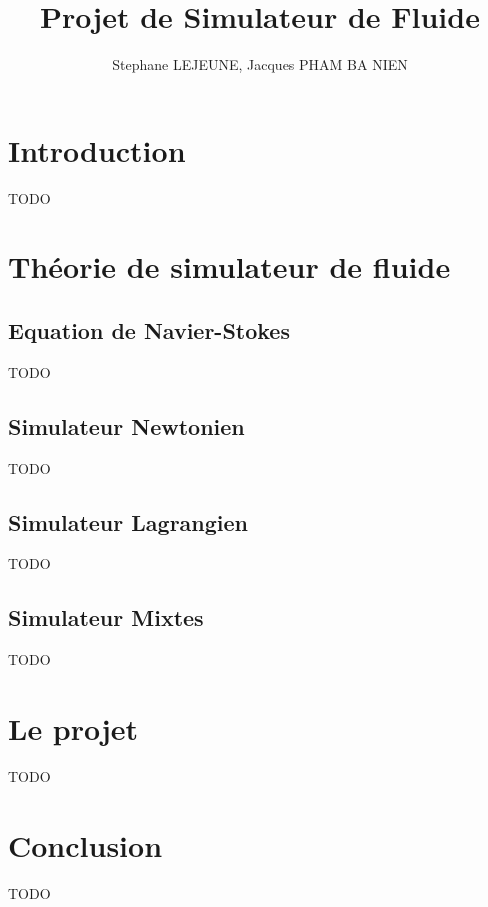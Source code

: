 \documentclass{article}
\author{Stephane LEJEUNE, Jacques PHAM BA NIEN} %
\title{Projet de Simulateur de Fluide}
\begin{document}
\maketitle
\newpage
\tableofcontents
\newpage

\section{Introduction}
TODO
\section{Théorie de simulateur de fluide}
\subsection{Equation de Navier-Stokes}
TODO
\subsection{Simulateur Newtonien}
TODO
\subsection{Simulateur Lagrangien}
TODO
\subsection{Simulateur Mixtes}
TODO

\section{Le projet}
TODO

\section{Conclusion}
TODO
\end{document}

